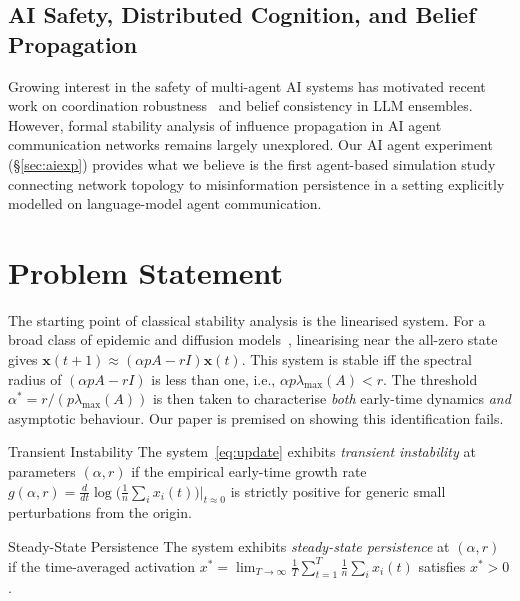 \documentclass[10pt,twocolumn]{article}
\theoremstyle{myproof}
\newcommand{\lmax}{\lambda_{\max}}
\newcommand{\xst}{x^*}
\begin{document}
\subsection{AI Safety, Distributed Cognition, and Belief Propagation}
Growing interest in the safety of multi-agent AI systems has motivated recent work on coordination
robustness~\cite{cao2013} and belief consistency in LLM ensembles. However, formal stability
analysis of influence propagation in AI agent communication networks remains largely unexplored.
Our AI agent experiment (\S\ref{sec:aiexp}) provides what we believe is the first agent-based
simulation study connecting network topology to misinformation persistence in a setting explicitly
modelled on language-model agent communication.

\section{Problem Statement}
\label{sec:problem}

The starting point of classical stability analysis is the linearised system. For a broad class of
epidemic and diffusion models~\cite{pastor2001,vanmieghem2009}, linearising near the all-zero
state gives $\mathbf{x}(t+1)\approx(\alpha p A - rI)\mathbf{x}(t)$. This system is stable iff the
spectral radius of $(\alpha p A - rI)$ is less than one, i.e., $\alpha p\lmax(A)<r$. The
threshold $\alpha^*=r/(p\lmax(A))$ is then taken to characterise \emph{both} early-time dynamics
\emph{and} asymptotic behaviour. Our paper is premised on showing this identification fails.

\begin{definition}{Transient Instability}{}
The system~\eqref{eq:update} exhibits \emph{transient instability} at parameters $(\alpha,r)$ if
the empirical early-time growth rate
$g(\alpha,r)=\frac{d}{dt}\log\!\bigl(\frac{1}{n}\sum_i x_i(t)\bigr)\big|_{t\approx 0}$
is strictly positive for generic small perturbations from the origin.
\end{definition}

\begin{definition}{Steady-State Persistence}{}
The system exhibits \emph{steady-state persistence} at $(\alpha,r)$ if the time-averaged
activation $\xst=\lim_{T\to\infty}\frac{1}{T}\sum_{t=1}^T\frac{1}{n}\sum_i x_i(t)$ satisfies
$\xst>0$.
\end{definition}
\end{document}
